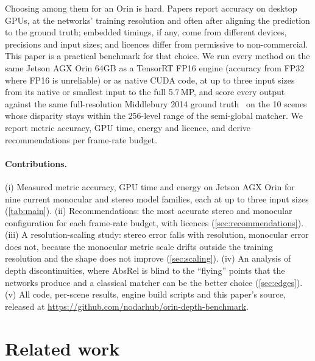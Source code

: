 \documentclass[10pt,twocolumn]{article}
\begin{document}
Choosing among them for an Orin is hard. Papers report accuracy on desktop GPUs, at the networks'
training resolution and often after aligning the prediction to the ground truth; embedded timings, if
any, come from different devices, precisions and input sizes; and licences differ from permissive to
non-commercial. This paper is a practical benchmark for that choice. We run every method on the same
Jetson AGX Orin 64GB as a TensorRT FP16 engine (accuracy from FP32 where FP16 is unreliable) or as native
CUDA code, at up to three input sizes from its native or smallest input to the full 5.7\,MP, and score
every output against the same full-resolution Middlebury 2014 ground truth~\cite{scharstein2014middlebury}
on the 10 scenes whose disparity stays within the 256-level range of the semi-global matcher. We report
metric accuracy, GPU time, energy and licence, and derive recommendations per frame-rate budget.

\paragraph{Contributions.}
(i) Measured metric accuracy, GPU time and energy on Jetson AGX Orin for nine current monocular and
stereo model families, each at up to three input sizes (\cref{tab:main}).
(ii) Recommendations: the most accurate stereo and monocular configuration for each frame-rate budget,
with licences (\cref{sec:recommendations}).
(iii) A resolution-scaling study: stereo error falls with resolution, monocular error does not, because
the monocular metric scale drifts outside the training resolution and the shape does not improve
(\cref{sec:scaling}).
(iv) An analysis of depth discontinuities, where AbsRel is blind to the ``flying'' points that the
networks produce and a classical matcher can be the better choice (\cref{sec:edges}).
(v) All code, per-scene results, engine build scripts and this paper's source, released at
\url{https://github.com/nodarhub/orin-depth-benchmark}.

\section{Related work}
\end{document}
